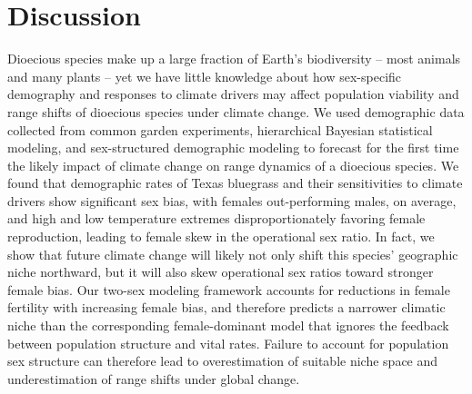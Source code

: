 \documentclass[12pt]{article}\usepackage[]{graphicx}\usepackage[dvipsnames]{xcolor}
\begin{document}
\section*{Discussion}
Dioecious species make up a large fraction of Earth's biodiversity -- most animals and many plants -- yet we have little knowledge about how sex-specific demography and responses to climate drivers may affect population viability and range shifts of dioecious species under climate change.
We used demographic data collected from common garden experiments, hierarchical Bayesian statistical modeling, and sex-structured demographic modeling to forecast for the first time the likely impact of climate change on range dynamics of a dioecious species.
We found that demographic rates of Texas bluegrass and their sensitivities to climate drivers show significant sex bias, with females out-performing males, on average, and high and low temperature extremes disproportionately favoring female reproduction, leading to female skew in the operational sex ratio. 
In fact, we show that future climate change will likely not only shift this species' geographic niche northward, but it will also skew operational sex ratios toward stronger female bias. 
Our two-sex modeling framework accounts for reductions in female fertility with increasing female bias, and therefore predicts a narrower climatic niche than the corresponding female-dominant model that ignores the feedback between population structure and vital rates. 
Failure to account for population sex structure can therefore lead to overestimation of suitable niche space and underestimation of range shifts under global change. 
\end{document}
